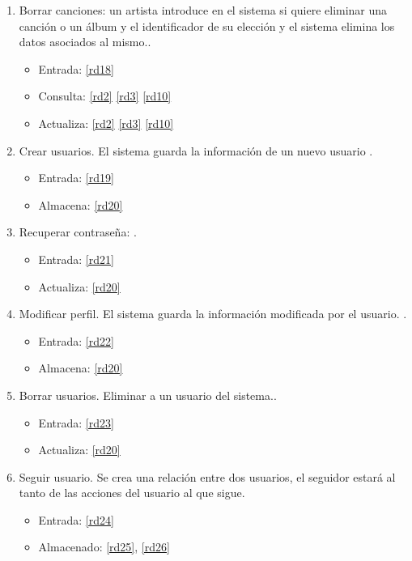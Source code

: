 \documentclass[12pt,a4paper]{article}
\begin{document}
\begin{enumerate}[label=\textnormal{RF\arabic*.}]
	 \item Borrar canciones: un artista introduce en el sistema si quiere eliminar una canción o un álbum y el identificador de su elección y el sistema elimina los datos asociados al mismo.\label{rf11}.
    	\begin{itemize}
			\item Entrada: \ref{rd18}
			\item Consulta: \ref{rd2} \ref{rd3} \ref{rd10}
			\item Actualiza: \ref{rd2} \ref{rd3} \ref{rd10}
		\end{itemize}
		
		
	 \item Crear usuarios. El sistema guarda la información de un nuevo usuario \label{rf12}.
    	\begin{itemize}
			\item Entrada: \ref{rd19}
			\item Almacena: \ref{rd20}
		\end{itemize}
		
	 \item Recuperar contraseña: \label{rf13}.
    	\begin{itemize}
			\item Entrada: \ref{rd21}
			\item Actualiza: \ref{rd20}
		\end{itemize}
		
	 \item Modificar perfil. El sistema guarda la información modificada por el usuario. \label{rf14}.
    	\begin{itemize}
			\item Entrada: \ref{rd22}
			\item Almacena: \ref{rd20}
		\end{itemize}
		
	 \item Borrar usuarios. Eliminar a un usuario del sistema.\label{rf15}.
    	\begin{itemize}
			\item Entrada: \ref{rd23}
			\item Actualiza: \ref{rd20}
		\end{itemize}
		
		
	 \item Seguir usuario. Se crea una relación entre dos usuarios, el seguidor estará al tanto de las acciones del usuario al que sigue. \label{rf16}
	 	\begin{itemize}
			\item Entrada: \ref{rd24}
			\item Almacenado: \ref{rd25}, \ref{rd26}
		\end{itemize}
	

\end{enumerate}
\end{document}
